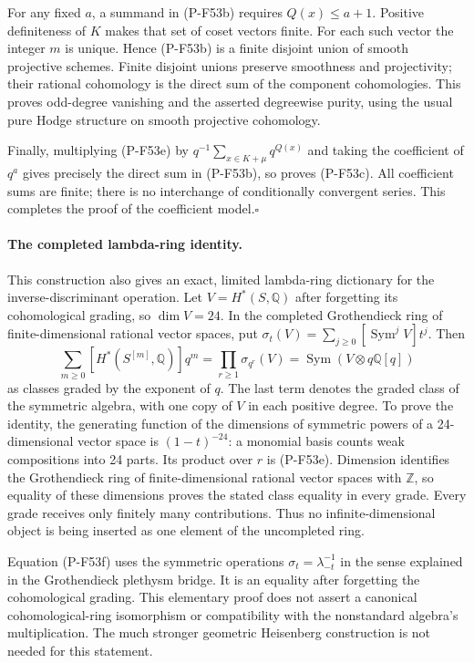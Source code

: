 \documentclass[11pt,a4paper]{article}
\begin{document}
For any fixed $a$, a summand in (P-F53b) requires
$Q(x)\le a+1$. Positive definiteness of $K$ makes that
set of coset vectors finite. For each such vector the
integer $m$ is unique. Hence (P-F53b) is a finite
disjoint union of smooth projective schemes. Finite
disjoint unions preserve smoothness and projectivity;
their rational cohomology is the direct sum of the
component cohomologies. This proves odd-degree
vanishing and the asserted degreewise purity, using
the usual pure Hodge structure on smooth projective
cohomology.

Finally, multiplying (P-F53e) by
$q^{-1}\sum_{x\in K+\mu}q^{Q(x)}$ and taking the
coefficient of $q^a$ gives precisely the direct sum
in (P-F53b), so proves (P-F53c). All coefficient sums
are finite; there is no interchange of conditionally
convergent series. This completes the proof of the
coefficient model.\hfill$\square$

\paragraph{The completed lambda-ring identity.}
This construction also gives an exact, limited lambda-ring
dictionary for the inverse-discriminant operation. Let
$V=H^*(S,\mathbb Q)$ after forgetting its cohomological
grading, so $\dim V=24$. In the completed Grothendieck
ring of finite-dimensional rational vector spaces, put
$\sigma_t(V)=\sum_{j\ge0}[\operatorname{Sym}^jV]t^j$.
Then
\[
 \sum_{m\ge0}[H^*(S^{[m]},\mathbb Q)]q^m
   =\prod_{r\ge1}\sigma_{q^r}(V)
   =\operatorname{Sym}\!\left(V\otimes q\mathbb Q[q]\right)
                                                        \tag{P-F53f}
\]
as classes graded by the exponent of $q$. The last term
denotes the graded class of the symmetric algebra, with
one copy of $V$ in each positive degree. To prove the
identity, the generating function of the dimensions
of symmetric powers of a 24-dimensional vector space
is $(1-t)^{-24}$: a monomial basis counts weak
compositions into 24 parts. Its product over $r$
is (P-F53e). Dimension identifies the Grothendieck
ring of finite-dimensional rational vector spaces
with $\mathbb Z$, so equality of these dimensions
proves the stated class equality in every grade.
Every grade receives only finitely many contributions.
Thus no infinite-dimensional object is being inserted
as one element of the uncompleted ring.

Equation (P-F53f) uses the symmetric operations
$\sigma_t=\lambda_{-t}^{-1}$ in the sense explained in
the Grothendieck plethysm bridge. It is an equality
after forgetting the cohomological grading. This
elementary proof does not assert a canonical
cohomological-ring isomorphism or compatibility with
the nonstandard algebra's multiplication. The much
stronger geometric Heisenberg construction is not
needed for this statement.
\end{document}
